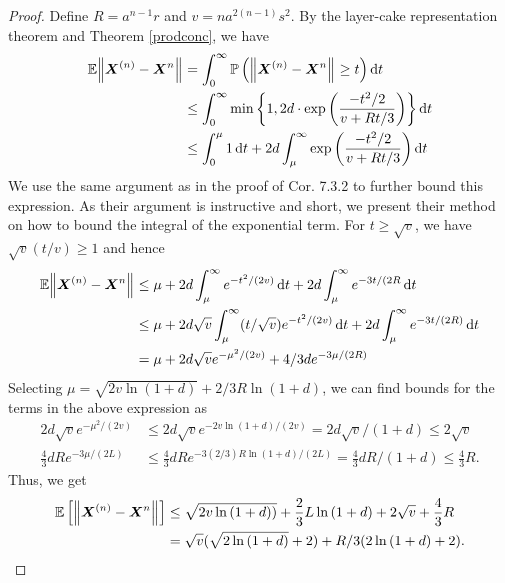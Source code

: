 \begin{proof}
  Define \( R= a^{n-1}r \) and \( v= na^{2(n-1)}s^{2}  \). By the layer-cake representation theorem and Theorem \ref{prodconc}, we have 
  \begin{align*}
    \mathbb{E} \norm{ \bm{X}^{(n)}-\bm{X}^{n}}_{}  &= \int_{0}^{\infty} \mathbb{P}\left(\norm{\bm{X}^{(n)}-\bm{X}^{n}}_{} \geq t\right) \dd{t} \\
                                                   & \leq \int_{0}^{\infty} \min_{} \left\{ 1, 2d \cdot \operatorname{exp}\left(\frac{-t^2/2}{v+Rt/3}\right)\right\} \dd{t} \\
                                                   & \leq \int_{0}^{\mu} 1  \dd{t} + 2d \int_{\mu}^{\infty} \operatorname{exp}\left(\frac{-t^2/2}{v+Rt/3}\right) \dd{t}
  \end{align*}
  We use the same argument as \cite{tropp2015introduction} in the proof of Cor. 7.3.2 to further bound this expression. As their argument is instructive and short, we present their method on how to bound the integral of the exponential term. For \( t \geq \sqrt{v}  \), we have \( \sqrt{v}(t/v) \geq 1\) and hence
  \begin{align*}
     \mathbb{E} \norm{ \bm{X}^{(n)}-\bm{X}^{n}}_{} & \leq \mu + 2d \int_{\mu}^{\infty} e^{-t^2/(2v)} \dd{t} + 2d \int_{\mu}^{\infty} e^{-3t/(2R} \dd{t} \\
                                                   & \leq \mu + 2d \sqrt{v}\int_{\mu}^{\infty} (t/ \sqrt{v})e^{-t^2/(2v)} \dd{t} + 2d \int_{\mu}^{\infty} e^{-3t/(2R)} \dd{t} \\
                                                   & = \mu + 2d\sqrt{v} e^{-\mu^2/(2v)} + 4/3d e^{-3\mu/(2R)} 
   \end{align*}
   Selecting \( \mu = \sqrt{2v \operatorname{ln}(1+d)} + 2/3 R \operatorname{ln}(1+d) \), we can find bounds for the terms in the above expression as 
   \begin{align*}
     2d \sqrt{v} e^{-\mu^2/(2v)} & \leq 2d \sqrt{v} e^{-2v \operatorname{ln}\left(1+d\right)/(2v)} = 2d \sqrt{v} /(1+d) \leq 2 \sqrt{v} \\
     \frac{4}{3}d R e^{-3\mu/(2L)} &\leq \frac{4}{3} dR e^{-3(2/3)R \operatorname{ln}\left(1+d\right)/(2L)} = \frac{4}{3}dR/(1+d) \leq \frac{4}{3}R.
   \end{align*}
   Thus, we get 
   \begin{align*} 
     \mathbb{E}\left[\norm{ \bm{X}^{(n)}-\bm{X}^{n}}_{} \right] &\leq \sqrt{2v \operatorname{ln}\left(1+d)\right)} + \frac{2}{3}L\operatorname{ln}\left(1+d\right) + 2 \sqrt{v} + \frac{4}{3}R  \\
                                        &= \sqrt{v}(\sqrt{2 \operatorname{ln}\left(1+d\right)}+2) + R/3 (2 \operatorname{ln}\left(1+d\right)+2).
 \end{align*}

\end{proof}


